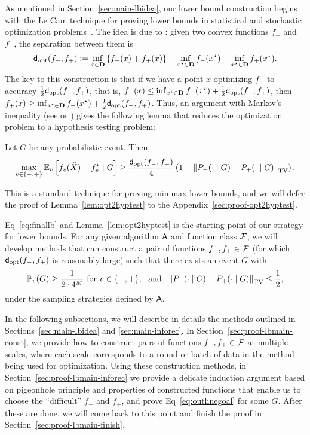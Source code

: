 As mentioned in Section~\ref{sec:main-lbidea}, our lower bound construction begins with the Le Cam technique for proving lower bounds in statistical and stochastic optimization
problems~\citep{Tsybakov09,AgarwalBaRaWa12,Duchi17}. The idea is due to \citeauthor{AgarwalBaRaWa12}: given two convex functions $f_-$ and $f_+$,
the separation between them is
\begin{equation*}
\fndist(f_-, f_+)
\defeq \inf_{x \in \domain}
\left\{f_-(x) + f_+(x) \right\}
- \inf_{x\opt \in \domain} f_-(x\opt) - \inf_{x\opt \in \domain} f_+(x\opt).
\end{equation*}
The key to this construction is that if we have a point $x$ optimizing $f_-$
to accuracy $\half \fndist(f_-, f_+)$, that is, $f_-(x) \le \inf_{x\opt \in
	\domain} f_-(x\opt) + \half\fndist(f_-, f_+)$, then $f_+(x) \ge \inf_{x\opt \in
	\domain} f_+(x\opt) + \half\fndist(f_-, f_+)$.  Thus, an argument with Markov's
inequality (see \citet[Eq.~(18)]{AgarwalBaRaWa12} or
\citet[Ch.~4.1]{Duchi17}) gives the following lemma that reduces the optimization problem to a hypothesis testing problem:
\begin{lemma}
	\label{lem:opt2hyptest}
	Let $G$ be any probabilistic event.	Then,
	\begin{equation*}
		\max_{v \in \{-,+\}} \E_{v} \left [ f_v(\what X) - f_v\opt \mid G \right ]
		\geq
		\frac{\fndist(f_-, f_+)}{4}
		\left( 1-\tvnorm{ P_-(\cdot \mid G) -P_+(\cdot \mid G) } \right).
	\end{equation*}
\end{lemma}
This is a standard technique for proving minimax lower bounds, and we will defer the proof of Lemma~\ref{lem:opt2hyptest} to the Appendix~\ref{sec:proof-opt2hyptest}.

Eq~\eqref{eq:finallb} and Lemma~\ref{lem:opt2hyptest} is the starting point of our
strategy for lower bounds.
For any given algorithm $\mathsf{A}$ and function class $\mathcal{F}$, 
we will develop methods that can construct a pair of functions $f_-,f_+ \in \mathcal{F}$
(for which $\fndist(f_-, f_+)$ is reasonably large)
such that there exists an event $G$ with
\begin{equation}
\label{eq:outlinegoal}
\P_{v} (G) \geq \frac{1}{2\cdot 4^M} \text{ for } v \in \{-,+\},
~~\text{and}~~
\tvnorm{ P_-(\cdot \mid G) -P_+(\cdot \mid G) } \leq \half,
\end{equation}
under the sampling strategies defined by $\mathsf{A}$.

In the following subsections, we will describe in details the methods outlined in Sections~\ref{sec:main-lbidea} and \ref{sec:main-inforec}.
In Section~\ref{sec:proof-lbmain-const}, we provide how to construct pairs of functions $f_-,f_+ \in \mathcal{F}$ at multiple scales, where each scale corresponds to a round or batch of data
in the method being used for optimization.
Using these construction methods, in Section~\ref{sec:proof-lbmain-inforec} we provide a delicate induction argument based on pigeonhole principle and properties of constructed functions that enable us to choose the ``difficult'' $f_-$ and $f_+$, and prove Eq~\eqref{eq:outlinegoal} for some $G$. After these are done, we will come back to this point and finish the proof in Section~\ref{sec:proof-lbmain-finish}.

